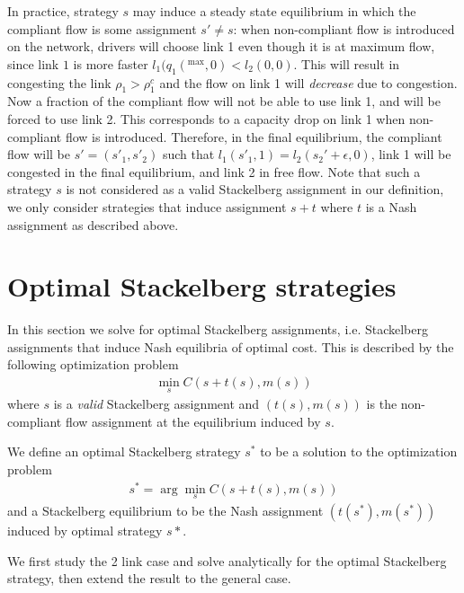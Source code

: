 In practice, strategy $s$ may induce a steady state equilibrium in which the compliant flow is some assignment $s' \neq s$: when non-compliant flow is introduced on the network, drivers will choose link 1 even though it is at maximum flow, since link $1$ is more faster $l_1(q_1(^{\max}, 0) < l_2(0, 0)$. This will result in congesting the link $\rho_1 > \rho_1^c$ and the flow on link 1 will \emph{decrease} due to congestion. Now a fraction of the compliant flow will not be able to use link 1, and will be forced to use link 2. This corresponds to a capacity drop on link 1 when non-compliant flow is introduced. Therefore, in the final equilibrium, the compliant flow will be $s' = (s'_1, s'_2)$ such that $l_1(s'_1, 1) = l_2(s_2' + \epsilon, 0)$, link 1 will be congested in the final equilibrium, and link 2 in free flow. Note that such a strategy $s$ is not considered as a valid Stackelberg assignment in our definition, we only consider strategies that induce assignment $s + t$ where $t$ is a Nash assignment as described above.









\section{Optimal Stackelberg strategies}

In this section we solve for optimal Stackelberg assignments, i.e. Stackelberg assignments that induce Nash equilibria of optimal cost. This is described by the following optimization problem
\begin{align*}
\min_s C\left( s + t(s), m(s) \right)
\end{align*}
where $s$ is a \emph{valid} Stackelberg assignment and $(t(s), m(s))$ is the non-compliant flow assignment at the equilibrium induced by $s$.

We define an optimal Stackelberg strategy $s^*$ to be a solution to the optimization problem
\begin{align*}
s^* = \arg \min_s C\left( s + t(s), m(s) \right)
\end{align*}
and a Stackelberg equilibrium to be the Nash assignment $(t(s^*), m(s^*))$ induced by optimal strategy $s*$.


\bigskip
We first study the 2 link case and solve analytically for the optimal Stackelberg strategy, then extend the result to the general case.


